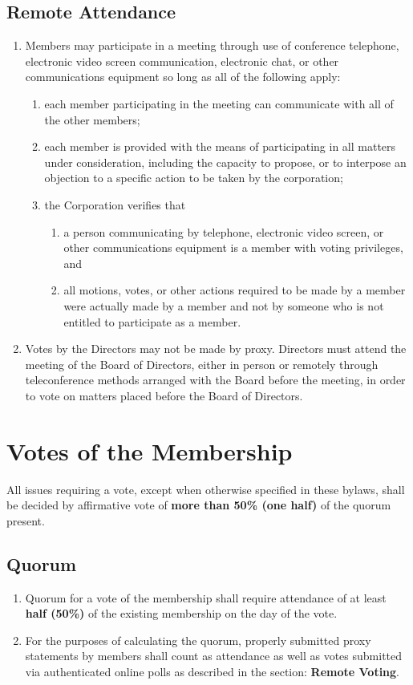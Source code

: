 \documentclass{article}
\begin{document}
\subsection{Remote Attendance}
\begin{enumerate}
    \item Members may participate in a meeting through use of conference
    telephone, electronic video screen communication, electronic chat, or other
    communications equipment so long as all of the following apply:
    \begin{enumerate}
        \item each member participating in the meeting can communicate with all
        of the other members;
        \item each member is provided with the means of participating in all
        matters under consideration, including the capacity to propose, or to
        interpose an objection to a specific action to be taken by the
        corporation;
        \item the Corporation verifies that
        \begin{enumerate}
            \item a person communicating by telephone, electronic video screen,
        or other communications equipment is a member with voting privileges,
        and
            \item all motions, votes, or other actions required to be made by a
        member were actually made by a member and not by someone who is not
        entitled to participate as a member.
        \end{enumerate}
    \end{enumerate}
    \item Votes by the Directors may not be made by proxy. Directors must attend
    the meeting of the Board of Directors, either in person or remotely through
    teleconference methods arranged with the Board before the meeting, in order
    to vote on matters placed before the Board of Directors.
\end{enumerate}
\section{Votes of the Membership}
All issues requiring a vote, except when otherwise specified in these bylaws, shall be decided by affirmative vote of \textbf{more than 50\% (one half)} of the quorum present.
\subsection{Quorum}
  \begin{enumerate}
    \item Quorum for a vote of the membership shall require attendance of at
    least \textbf{half (50\%)} of the existing membership on the day of the vote.
    \item For the purposes of calculating the quorum, properly submitted proxy
    statements by members shall count as attendance as well as votes submitted via
    authenticated online polls as described in the section: \textbf{Remote Voting}.
  \end{enumerate}
\end{document}
